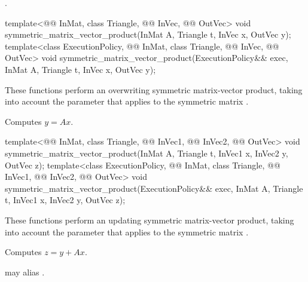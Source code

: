 \pnum
\complexity
{}.

%
\begin{itemdecl}
template<@@ InMat, class Triangle, @@ InVec, @@ OutVec>
  void symmetric_matrix_vector_product(InMat A, Triangle t, InVec x, OutVec y);
template<class ExecutionPolicy,
         @@ InMat, class Triangle, @@ InVec, @@ OutVec>
  void symmetric_matrix_vector_product(ExecutionPolicy&& exec,
                                       InMat A, Triangle t, InVec x, OutVec y);
\end{itemdecl}

\begin{itemdescr}

\pnum
These functions perform an overwriting symmetric matrix-vector product,
taking into account the  parameter
that applies to the symmetric matrix .

\pnum
\effects
Computes $y = A x$.
\end{itemdescr}

%
\begin{itemdecl}
template<@@ InMat, class Triangle, @@ InVec1, @@ InVec2, @@ OutVec>
  void symmetric_matrix_vector_product(InMat A, Triangle t, InVec1 x, InVec2 y, OutVec z);
template<class ExecutionPolicy,
         @@ InMat, class Triangle, @@ InVec1, @@ InVec2, @@ OutVec>
  void symmetric_matrix_vector_product(ExecutionPolicy&& exec,
                                       InMat A, Triangle t, InVec1 x, InVec2 y, OutVec z);
\end{itemdecl}

\begin{itemdescr}
\pnum
These functions perform an updating symmetric matrix-vector product,
taking into account the  parameter
that applies to the symmetric matrix .

\pnum
\effects
Computes $z = y + A x$.

\pnum
\remarks
{} may alias .
\end{itemdescr}

